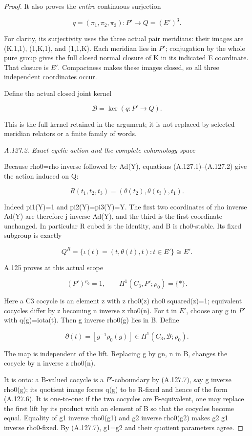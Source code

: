 \begin{proof}
It also proves the \emph{entire} continuous surjection

\[
 q=(\pi_1,\pi_2,\pi_3):P'\longrightarrow Q=(E')^3.
\tag{A.127.3}
\]

For clarity, its surjectivity uses the three actual pair meridians: their images are (K,1,1), (1,K,1), and (1,1,K). Each meridian lies in \(P'\); conjugation by the whole pure group gives the full closed normal closure of K in its indicated E coordinate. That closure is \(E'\). Compactness makes these images closed, so all three independent coordinates occur.

Define the actual closed joint kernel

\[
 \mathcal B=\ker(q:P'\to Q).
\tag{A.127.4}
\]

This is the full kernel retained in the argument; it is not replaced by selected meridian relators or a finite family of words.

\par\smallskip\noindent\emph{A.127.2. Exact cyclic action and the complete cohomology space}

Because rho0=rho inverse followed by Ad(Y), equations (A.127.1)--(A.127.2) give the action induced on Q:

\[
 R(t_1,t_2,t_3)=(\theta(t_2),\theta(t_3),t_1).
\tag{A.127.5}
\]

Indeed pi1(Y)=1 and pi2(Y)=pi3(Y)=Y. The first two coordinates of rho inverse Ad(Y) are therefore j inverse Ad(Y), and the third is the first coordinate unchanged. In particular R cubed is the identity, and B is rho0-stable. Its fixed subgroup is exactly

\[
 Q^R=\{\iota(t)=(t,\theta(t),t):t\in E'\}\cong E'.
\tag{A.127.6}
\]

A.125 proves at this actual scope

\[
 (P')^{\rho_0}=1,\qquad H^1(C_3,P';\rho_0)=\{*\}.
\tag{A.127.7}
\]

Here a C3 cocycle is an element z with z rho0(z) rho0 squared(z)=1; equivalent cocycles differ by z becoming n inverse z rho0(n). For t in \(E'\), choose any g in \(P'\) with q(g)=iota(t). Then g inverse rho0(g) lies in B. Define

\[
 \partial(t)=[g^{-1}\rho_0(g)]\in H^1(C_3,\mathcal B;\rho_0).
\tag{A.127.8}
\]

The map is independent of the lift. Replacing g by gn, n in B, changes the cocycle by n inverse z rho0(n).

It is onto: a B-valued cocycle is a \(P'\)-coboundary by (A.127.7), say g inverse rho0(g); its quotient image forces q(g) to be R-fixed and hence of the form (A.127.6). It is one-to-one: if the two cocycles are B-equivalent, one may replace the first lift by its product with an element of B so that the cocycles become equal. Equality of g1 inverse rho0(g1) and g2 inverse rho0(g2) makes g2 g1 inverse rho0-fixed. By (A.127.7), g1=g2 and their quotient parameters agree.


\end{proof}
